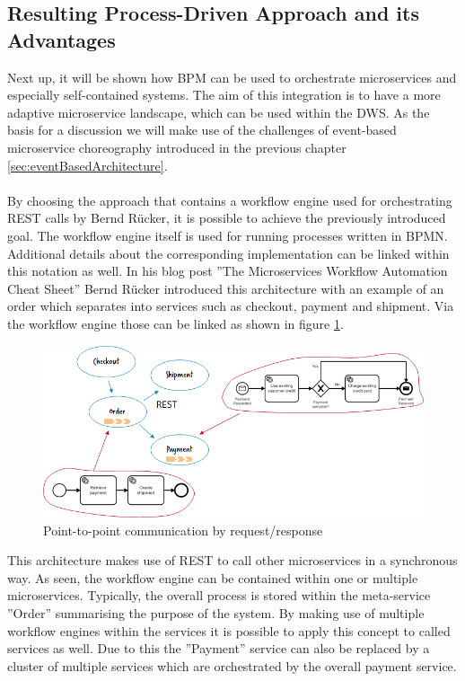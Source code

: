 \subsection{Resulting Process-Driven Approach and its Advantages}
Next up, it will be shown how BPM can be used to orchestrate microservices and especially self-contained systems. The aim of this integration is to have a more adaptive microservice landscape, which can be used within the DWS. As the basis for a discussion we will make use of the challenges of event-based microservice choreography introduced in the previous chapter \ref{sec:eventBasedArchitecture}.\newline
\\
\\
By choosing the approach that contains a workflow engine used for orchestrating REST calls by Bernd Rücker, it is possible to achieve the previously introduced goal. The workflow engine itself is used for running processes written in BPMN. Additional details about the corresponding implementation can be linked within this notation as well.\newline
In his blog post ''The Microservices Workflow Automation Cheat Sheet'' Bernd Rücker introduced this architecture with an example of an order which separates into services such as checkout, payment and shipment. Via the workflow engine those can be linked as shown in figure \ref{fig:RestArchitecture}. \cite{orchestrationMicroServices}\newline
\begin{figure}[!htb]
    \centering
    \includegraphics[scale=0.65]{pictures/RestArchitecture.png}
    \caption{Point-to-point communication by request/response \cite{orchestrationMicroServices}}
    \label{fig:RestArchitecture}
\end{figure}
This architecture makes use of REST to call other microservices in a synchronous way. As seen, the workflow engine can be contained within one or multiple microservices. \cite{orchestrationMicroServices} Typically, the overall process is stored within the meta-service ''Order'' summarising the purpose of the system. By making use of multiple workflow engines within the services it is possible to apply this concept to called services as well. Due to this the ''Payment'' service can also be replaced by a cluster of multiple services which are orchestrated by the overall payment service.\newline
